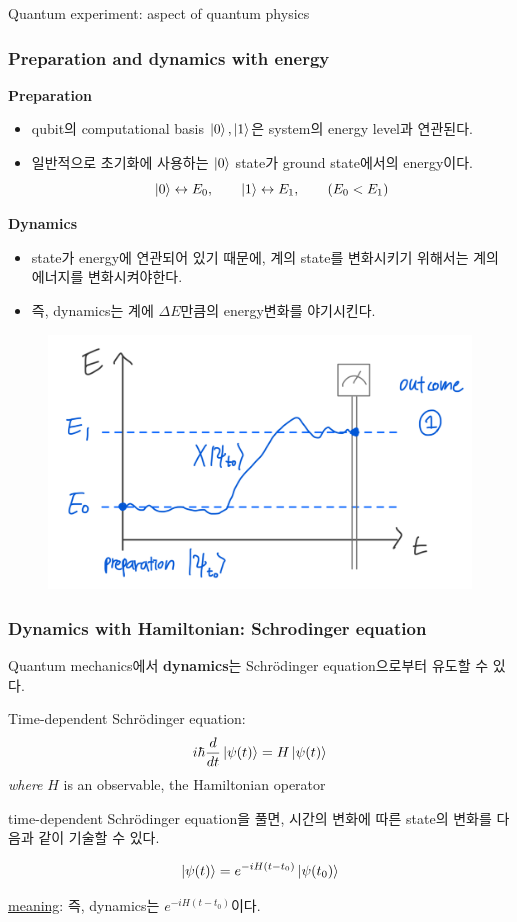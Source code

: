 \documentclass[9pt]{beamer}
\begin{document}
    \begin{section}{Quantum experiment: aspect of quantum physics}
        \begin{frame}
            \frametitle{Preparation and dynamics with energy}
            \textbf{Preparation}
            \begin{itemize}
                \item qubit의 computational basis $\ket 0, \ket 1$은 system의 \alert{energy level}과 연관된다.
                \item 일반적으로 초기화에 사용하는 $\ket 0$ state가 ground state에서의 energy이다.
                $$\ket{0} \leftrightarrow E_0, \qquad \ket{1} \leftrightarrow E_1,\qquad (E_0 < E_1) $$
            \end{itemize}
            \vspace{0.2cm}
            \textbf{Dynamics}
            \begin{itemize}
                \item state가 energy에 연관되어 있기 때문에, 계의 state를 변화시키기 위해서는 \alert{계의 에너지를 변화}시켜야한다.
                \item 즉, dynamics는 계에 $\Delta E$만큼의 energy변화를 야기시킨다.
            \end{itemize}
            \begin{figure}
                \includegraphics[width=0.45\columnwidth]{image/L1_energy.png}
            \end{figure}
            \vspace{-0.1cm}
        \end{frame}

        \begin{frame}
            \frametitle{Dynamics with Hamiltonian: Schrodinger equation}
            Quantum mechanics에서 \textbf{dynamics}는 Schrödinger equation으로부터 유도할 수 있다.
            \begin{theorem}
                Time-dependent Schrödinger equation:
                $$i \hbar \frac{d}{dt} \ket{\psi(t)} = H\ket{\psi(t)}$$
                \textit{where} $H$ is an observable, the Hamiltonian operator
            \end{theorem}
            \vspace{0.4cm}
            time-dependent Schrödinger equation을 풀면, 시간의 변화에 따른 state의 변화를 다음과 같이 기술할 수 있다.
            \begin{corollary}
                $$\ket{\psi(t) } = e^{-i H(t-t_0)} \ket{\psi(t_0)}$$
            \end{corollary}
            \checkmark \underline{meaning}: 즉, dynamics는 $e^{-iH(t-t_0)}$이다.
        \end{frame}



\end{section}
\end{document}
